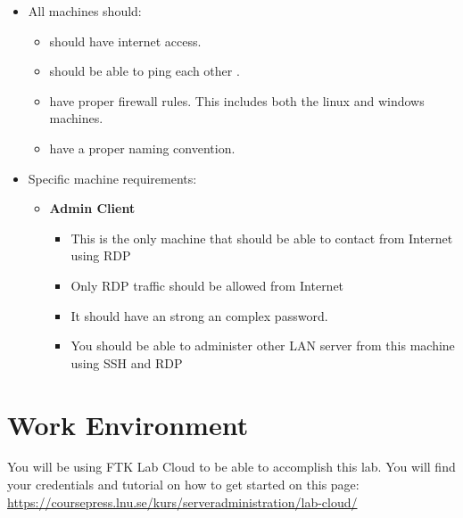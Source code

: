 \documentclass[paper=a4, fontsize=11pt]{report} %
\begin{document}
\begin{itemize}
    \item All machines should:
    \begin{itemize}
		\item should have internet access.
		\item should be able to ping each other .
        \item have proper firewall rules. This includes both the linux and windows machines.
    	\item have a proper naming convention.
    \end{itemize}
	\item Specific machine requirements:
    \begin{itemize}
        \item \textbf{Admin Client}
        \begin{itemize}
			\item This is the only machine that should be able to contact from Internet using RDP
			\item Only RDP traffic should be allowed from Internet
        	\item It should have an strong an complex password.
        	\item You should be able to administer other LAN server from this machine using SSH and RDP
        \end{itemize}        
    \end{itemize}
\end{itemize}

\section{Work Environment}
\label{environment}

You will be using FTK Lab Cloud to be able to accomplish this lab. You will find your credentials and tutorial on how to get started on this page: \href{https://coursepress.lnu.se/kurs/serveradministration/lab-cloud/}{https://coursepress.lnu.se/kurs/serveradministration/lab-cloud/}
\end{document}
